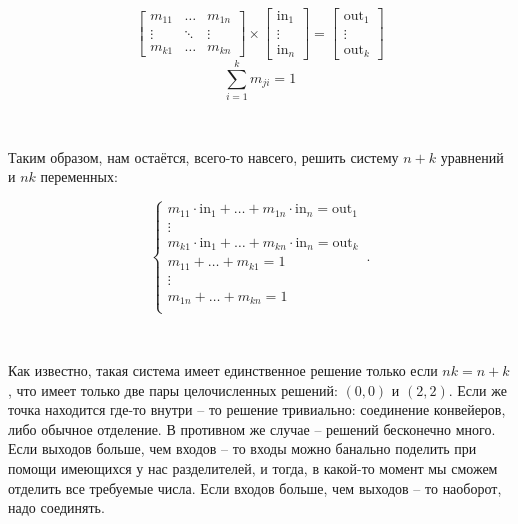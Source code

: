 $$
\left[
\begin{matrix}
	m_{11} & \ldots & m_{1n} \\
	\vdots & \ddots & \vdots \\
	m_{k1} & \ldots & m_{kn}
\end{matrix}
\right]
\times
\left[
\begin{matrix}
	\text{in}_1 \\
	\vdots \\
	\text{in}_n
\end{matrix}
\right]
=
\left[
\begin{matrix}
	\text{out}_1 \\
	\vdots \\
	\text{out}_k
\end{matrix}
\right]
$$
$$
\sum_{i=1}^k m_{ji} = 1
$$


\

\noindent Таким образом, нам остаётся, всего-то навсего, решить систему $n+k$ уравнений и $nk$ переменных:

\begin{equation*}
	\begin{cases}
		m_{11}\cdot \text{in}_1 + \ldots + m_{1n}\cdot \text{in}_n = \text{out}_1 \\
		\vdots \\
		m_{k1}\cdot \text{in}_1 + \ldots + m_{kn}\cdot \text{in}_n = \text{out}_k \\
		m_{11} + \ldots + m_{k1} = 1 \\
		\vdots \\
		m_{1n} + \ldots + m_{kn} = 1 \\
	\end{cases}\,.
\end{equation*}

\

Как известно, такая система имеет единственное решение только если $nk = n+k$, что имеет только две пары целочисленных решений: $(0,0)$ и $(2,2)$. Если же точка находится где-то внутри -- то решение тривиально: соединение конвейеров, либо обычное отделение. В противном же случае -- решений бесконечно много. Если выходов больше, чем входов -- то входы можно банально поделить при помощи имеющихся у нас разделителей, и тогда, в какой-то момент мы сможем отделить все требуемые числа. Если входов больше, чем выходов -- то наоборот, надо соединять.


























